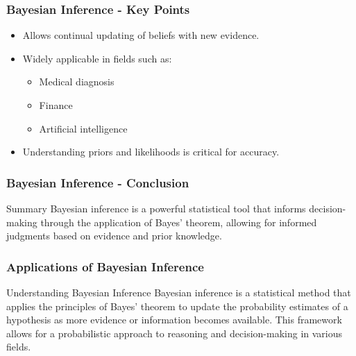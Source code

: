 \documentclass[aspectratio=169]{beamer}
\begin{document}
\begin{frame}[fragile]
    \frametitle{Bayesian Inference - Key Points}
    \begin{itemize}
        \item Allows continual updating of beliefs with new evidence.
        \item Widely applicable in fields such as:
        \begin{itemize}
            \item Medical diagnosis
            \item Finance
            \item Artificial intelligence
        \end{itemize}
        \item Understanding priors and likelihoods is critical for accuracy.
    \end{itemize}
\end{frame}

\begin{frame}[fragile]
    \frametitle{Bayesian Inference - Conclusion}
    \begin{block}{Summary}
        Bayesian inference is a powerful statistical tool that informs decision-making through the application of Bayes' theorem, allowing for informed judgments based on evidence and prior knowledge.
    \end{block}
\end{frame}

\begin{frame}[fragile]
  \frametitle{Applications of Bayesian Inference}
  
  \begin{block}{Understanding Bayesian Inference}
    Bayesian inference is a statistical method that applies the principles of Bayes' theorem to update the probability estimates of a hypothesis as more evidence or information becomes available. This framework allows for a probabilistic approach to reasoning and decision-making in various fields.
  \end{block}
\end{frame}
\end{document}
